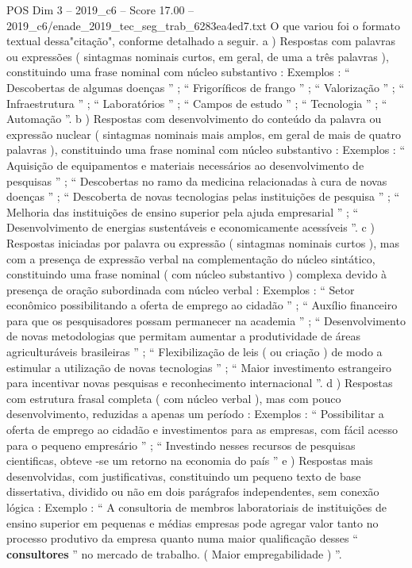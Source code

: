 \begin{textsample}{POS Dim 3 – 2019\_c6 – Score 17.00 – 2019\_c6/enade\_2019\_tec\_seg\_trab\_6283ea4ed7.txt}
O que variou foi o formato textual dessa"citação", conforme detalhado a seguir. a ) Respostas com palavras ou expressões ( sintagmas nominais curtos, em geral, de uma a três palavras ), constituindo uma frase nominal com núcleo substantivo : Exemplos : “ Descobertas de algumas doenças ” ; “ Frigoríficos de frango ” ; “ Valorização ” ; “ Infraestrutura ” ; “ Laboratórios ” ; “ Campos de estudo ” ; “ Tecnologia ” ; “ Automação ”. b ) Respostas com desenvolvimento do conteúdo da palavra ou expressão nuclear ( sintagmas nominais mais amplos, em geral de mais de quatro palavras ), constituindo uma frase nominal com núcleo substantivo : Exemplos : “ Aquisição de equipamentos e materiais necessários ao desenvolvimento de pesquisas ” ; “ Descobertas no ramo da medicina relacionadas à cura de novas doenças ” ; “ Descoberta de novas tecnologias pelas instituições de pesquisa ” ; “ Melhoria das instituições de ensino superior pela ajuda empresarial ” ; “ Desenvolvimento de energias sustentáveis e economicamente acessíveis ”. c ) Respostas iniciadas por palavra ou expressão ( sintagmas nominais curtos ), mas com a presença de expressão verbal na complementação do núcleo sintático, constituindo uma frase nominal ( com núcleo substantivo ) complexa devido à presença de oração subordinada com núcleo verbal : Exemplos : “ Setor econômico possibilitando a oferta de emprego ao cidadão ” ; “ Auxílio financeiro para que os pesquisadores possam permanecer na academia ” ; “ Desenvolvimento de novas metodologias que permitam aumentar a produtividade de áreas agriculturáveis brasileiras ” ; “ Flexibilização de leis ( ou criação ) de modo a estimular a utilização de novas tecnologias ” ; “ Maior investimento estrangeiro para incentivar novas pesquisas e reconhecimento internacional ”. d ) Respostas com estrutura frasal completa ( com núcleo verbal ), mas com pouco desenvolvimento, reduzidas a apenas um período : Exemplos : “ Possibilitar a oferta de emprego ao cidadão e investimentos para as empresas, com fácil acesso para o pequeno empresário ” ; “ Investindo nesses recursos de pesquisas cientificas, obteve -se um retorno na economia do país ” e ) Respostas mais desenvolvidas, com justificativas, constituindo um pequeno texto de base dissertativa, dividido ou não em dois parágrafos independentes, sem conexão lógica : Exemplo : “ A consultoria de membros laboratoriais de instituições de ensino superior em pequenas e médias empresas pode agregar valor tanto no processo produtivo da empresa quanto numa maior qualificação desses “ \textbf{consultores} ” no mercado de trabalho. ( Maior empregabilidade ) ”.

\end{textsample}
